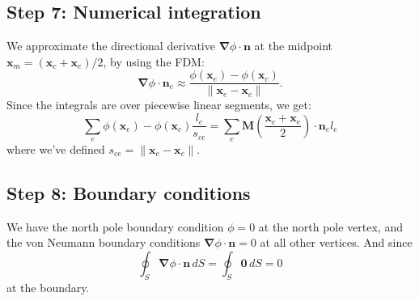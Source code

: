 \documentclass[acmtog]{acmart}
\begin{document}
\subsection*{Step 7: Numerical integration}
We approximate the directional derivative $\boldsymbol \nabla\phi \cdot \boldsymbol n$ at the midpoint $\boldsymbol x_m = (\boldsymbol x_c + \boldsymbol x_e) / 2$, by using the FDM:\@
%
\begin{equation}
  \boldsymbol \nabla \phi \cdot \boldsymbol n_e \approx \frac{\phi(\boldsymbol x_e) - \phi(\boldsymbol x_c)}{\lVert \boldsymbol x_e  - \boldsymbol x_c \rVert}.
\end{equation}
%
Since the integrals are over piecewise linear segments, we get:
%
\begin{equation}
  \sum_e \phi(\boldsymbol x_e) - \phi(\boldsymbol x_c) \frac{l_e}{s_{ce}  } = \sum_e \boldsymbol M\left( \frac{\boldsymbol x_c + \boldsymbol x_e}{2} \right) \cdot \boldsymbol n_e l_e \label{eq:num_int1}
\end{equation}
%
where we've defined $s_{ce} = \lVert \boldsymbol x_e - \boldsymbol x _c \rVert$.

\subsection*{Step 8: Boundary conditions}
We have the north pole boundary condition $\phi = 0$ at the north pole vertex, and the von Neumann boundary conditions $\boldsymbol \nabla \phi \cdot \boldsymbol n = 0$ at all other vertices. And since
%
\begin{equation}
  \oint_{S} \boldsymbol \nabla \phi \cdot \boldsymbol n \, dS = \oint_{S} \boldsymbol 0 \, dS = 0
\end{equation}
%
at the boundary.
\end{document}
